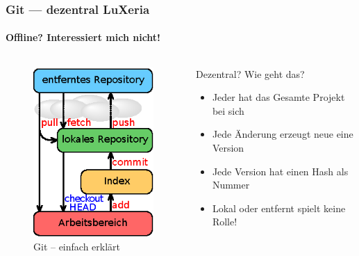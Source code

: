 \begin{frame}
    \frametitle{Git --- dezentral \hfill{} \footnotesize{LuXeria}}
    \framesubtitle{Offline? Interessiert mich nicht!}
    \begin{columns}
        \begin{column}{5cm}
            \begin{figure}
                \includegraphics[scale=1.2]{git_local.eps}
                \caption{Git -- einfach erklärt}
            \end{figure}
        \end{column}
        \begin{column}{5cm}
            \begin{block}{Dezentral? Wie geht das?}
                \begin{itemize}
                    \item Jeder hat das Gesamte Projekt bei sich
                    \item Jede Änderung erzeugt neue eine Version
                    \item Jede Version hat einen Hash als Nummer
                    \item Lokal oder entfernt spielt keine Rolle!
                \end{itemize}
            \end{block}
        \end{column}
    \end{columns}
\end{frame}


